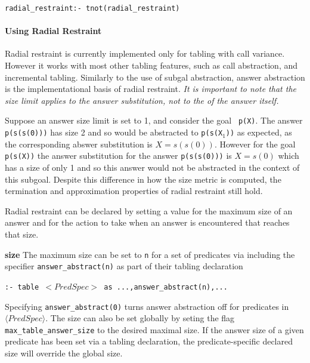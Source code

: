 {\tt radial\_restraint:- tnot(radial\_restraint)}


\paragraph*{Using Radial Restraint}
%
Radial restraint is currently implemented only for tabling with call
variance.  However it works with most other tabling features, such as
call abstraction, and incremental tabling.
%
Similarly to the use of subgal abstraction, answer abstraction is the
implementational basis of radial restraint.  {\em It is important to note
that the size limit applies to the answer substitution, not to the 
of the answer itself.}

\begin{example}
Suppose an answer size limit is set to 1, and consider the goal {\tt
  p(X)}.  The answer {\tt p(s(s(0)))} has size 2 and so would be
abstracted to {\tt p(s(X$_1$))} as expected, as the corresponding
abswer substitution is $X = s(s(0))$.  However for the goal {\tt
  p(s(X))} the answer substitution for the answer {\tt p(s(s(0)))} is
$X = s(0)$ which has a size of only 1 and so this answer would not be
abstracted in the context of this subgoal.  Despite this difference in
how the size metric is computed, the termination and approximation
properties of radial restraint still hold.
\end{example}

Radial restraint can be declared by setting a value for the maximum
size of an answer and for the action to take when an answer is
encountered that reaches that size.
%
\bi
\item {\bf size} The maximum size can be set to {\tt n} for a set of
  predicates via including the specifier {\tt answer\_abstract(n)} as
  part of their tabling declaration

{\tt :- table $<PredSpec>$ as ...,answer\_abstract(n),...}

  Specifying {\tt answer\_abstract(0)} turns answer abstraction off
  for predicates in $\langle PredSpec \rangle$.  The size can also be
  set globally by seting the flag {\tt max\_table\_answer\_size} to
  the desired maximal size.  If the answer size of a given predicate
  has been set via a tabling declaration, the predicate-specific
  declared size will override the global size.

